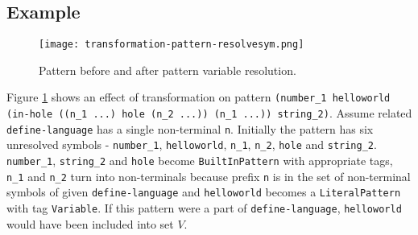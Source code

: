 \subsection{Example}

\begin{figure}[H]
\texttt{[image: transformation-pattern-resolvesym.png]}
\caption{Pattern before and after pattern variable resolution.}
\label{transformation-pattern-resolvesym}
\end{figure}

Figure \ref{transformation-pattern-resolvesym} shows an effect of transformation on pattern \texttt{(number\_1 helloworld (in-hole ((n\_1 ...) hole (n\_2 ...)) (n\_1 ...)) string\_2)}. Assume related \texttt{define-language} has a single non-terminal \texttt{n}. Initially the pattern has six unresolved symbols - \texttt{number\_1}, \texttt{helloworld}, \texttt{n\_1}, \texttt{n\_2}, \texttt{hole} and \texttt{string\_2}. \texttt{number\_1}, \texttt{string\_2} and \texttt{hole} become \texttt{BuiltInPattern} with appropriate tags,  \texttt{n\_1} and \texttt{n\_2} turn into non-terminals because prefix \texttt{n} is in the set of non-terminal symbols of given \texttt{define-language} and \texttt{helloworld} becomes a \texttt{LiteralPattern} with tag \texttt{Variable}. If this pattern were a part of \texttt{define-language}, \texttt{helloworld} would have been included into set $V$.
